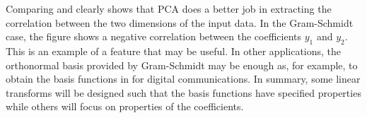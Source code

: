 Comparing  and  clearly shows that PCA does a better job in extracting the correlation between the two dimensions of the input data. In the Gram-Schmidt case, the figure shows a negative correlation between the coefficients $y_1$ and $y_2$. This is an example of a feature that may be useful. 
\ifml
\else
In other applications, the orthonormal basis provided by Gram-Schmidt may be enough as, for example, to obtain the basis functions in  for digital communications. 
\fi
In summary, some linear transforms will be designed  such that the basis functions have specified properties while others will focus on properties of the coefficients.
